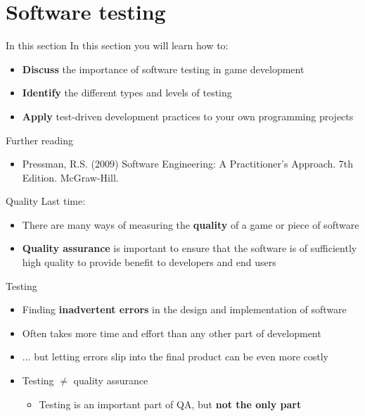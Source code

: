 \part{Software testing}
\frame{\partpage}

\begin{frame}{In this section}
    In this section you will learn how to:
    \begin{itemize}
        \item \textbf{Discuss} the importance of software testing in game development
        \item \textbf{Identify} the different types and levels of testing
        \item \textbf{Apply} test-driven development practices to your own programming projects
    \end{itemize}
\end{frame}

\begin{frame}{Further reading}
    \begin{itemize}
        \item Pressman, R.S. (2009) Software Engineering: A Practitioner's Approach. 7th Edition. McGraw-Hill.
    \end{itemize}
\end{frame}

\begin{frame}{Quality}
    Last time: \pause
    \begin{itemize}
        \item There are many ways of measuring the \textbf{quality} of a game or piece of software \pause
        \item \textbf{Quality assurance} is important to ensure that the software is of sufficiently high
            quality to provide benefit to developers and end users
    \end{itemize}
\end{frame}

\begin{frame}{Testing}
    \begin{itemize}
        \item Finding \textbf{inadvertent errors} in the design and implementation of software \pause
        \item Often takes more time and effort than any other part of development \pause
        \item ... but letting errors slip into the final product can be even more costly \pause
        \item Testing $\neq$ quality assurance \pause
            \begin{itemize}
                \item Testing is an important part of QA, but \textbf{not the only part}
            \end{itemize}
    \end{itemize}
\end{frame}

